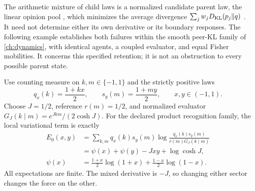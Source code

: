 The arithmetic mixture of child laws is a normalized candidate parent law,
the linear opinion pool \citep{GenestZidek1986}, which minimizes the
average divergence $\sum_jw_jD_{\mathrm{KL}}(p_j\Vert q)$ \citep{Abbas2009}.
It need not determine either its own derivative or its boundary responses.
The following example establishes both failures within the smooth peer-KL
family of \cref{ch:dynamics}, with identical agents, a coupled evaluator,
and equal Fisher mobilities. It concerns this specified retention; it is
not an obstruction to every possible parent state.

Use counting measure on $k,m\in\{-1,1\}$ and the strictly positive laws
\begin{equation}
 q_x(k)=\frac{1+kx}{2},\qquad s_y(m)=\frac{1+my}{2},
 \qquad x,y\in(-1,1).
 \label{inh:smooth-binary-laws}
\end{equation}
Choose $J=1/2$, reference $r(m)=1/2$, and normalized evaluator
$G_J(k\mid m)=e^{Jkm}/(2\cosh J)$. For the declared product recognition
family, the local variational term is exactly
\begin{equation}
 \begin{aligned}
 E_0(x,y)
 &=\sum_{k,m}q_x(k)s_y(m)
   \log\frac{q_x(k)s_y(m)}{r(m)G_J(k\mid m)}\\
 &=\psi(x)+\psi(y)-Jxy+\log\cosh J,\\
 \psi(x)&=\frac{1+x}{2}\log(1+x)
          +\frac{1-x}{2}\log(1-x).
 \end{aligned}
 \label{inh:smooth-local-energy}
\end{equation}
All expectations are finite. The mixed derivative is $-J$, so changing
either sector changes the force on the other.

